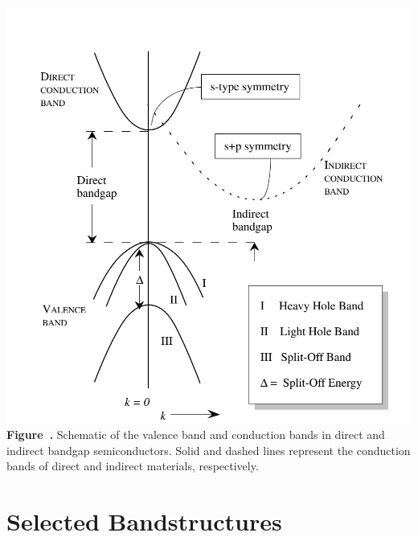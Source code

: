 \begin{center}
	\begin{minipage}{0.9\textwidth}
		\centering
		\includegraphics[width=\textwidth]{img/general_valenceband.png}
		\\[0.5em]
		\textbf{Figure~\thefigure.} Schematic of the valence band and conduction bands in direct and indirect bandgap semiconductors. Solid and dashed lines represent the conduction bands of direct and indirect materials, respectively.
		\label{fig:general_valenceband}
	\end{minipage}
\end{center}

\section{Selected Bandstructures}
